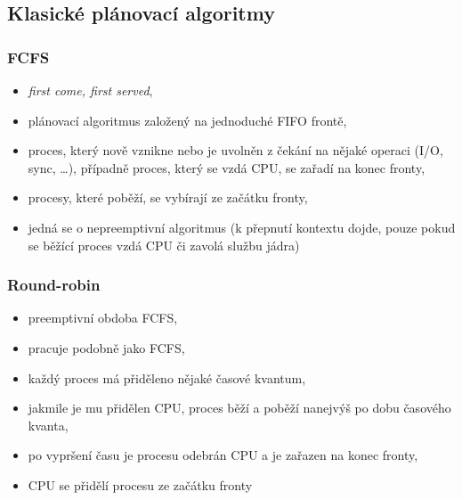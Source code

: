 \documentclass[a4paper, 11pt]{article}
\begin{document}
\subsection{Klasické plánovací algoritmy}
\subsubsection{FCFS}
\begin{itemize}
    \item \emph{first come, first served},
    \item plánovací algoritmus založený na jednoduché FIFO frontě,
    \item proces, který nově vznikne nebo je uvolněn z čekání na nějaké operaci (I/O, sync, \ldots), případně proces, který se vzdá CPU, se zařadí na konec fronty,
    \item procesy, které poběží, se vybírají ze začátku fronty,
    \item jedná se o nepreemptivní algoritmus (k přepnutí kontextu dojde, pouze pokud se běžící proces vzdá CPU či zavolá službu jádra)
\end{itemize}
 
\subsubsection{Round-robin}
\begin{itemize}
    \item preemptivní obdoba FCFS,
    \item pracuje podobně jako FCFS,
    \item každý proces má přiděleno nějaké časové kvantum,
    \item jakmile je mu přidělen CPU, proces běží a poběží nanejvýš po dobu časového kvanta,
    \item po vypršení času je procesu odebrán CPU a je zařazen na konec fronty,
    \item CPU se přidělí procesu ze začátku fronty
\end{itemize}
 
\end{document}

